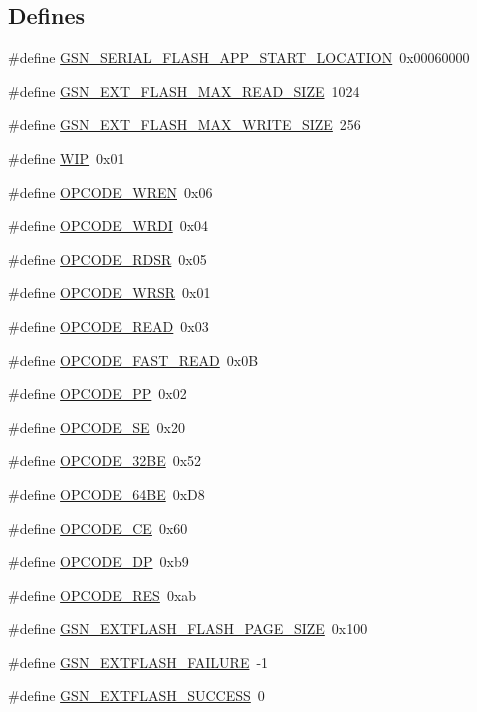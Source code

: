 \subsection*{Defines}
\begin{DoxyCompactItemize}
\item 
\#define \hyperlink{a00496_a2e9d396cf9751f126bb75703264ffe22}{GSN\_\-SERIAL\_\-FLASH\_\-APP\_\-START\_\-LOCATION}~0x00060000
\item 
\#define \hyperlink{a00496_a6fe277ae9982666f92a5ce2ee623228b}{GSN\_\-EXT\_\-FLASH\_\-MAX\_\-READ\_\-SIZE}~1024
\item 
\#define \hyperlink{a00496_a84d812f8d1343cffc3524235f29193ef}{GSN\_\-EXT\_\-FLASH\_\-MAX\_\-WRITE\_\-SIZE}~256
\item 
\#define \hyperlink{a00496_a6c36bc07fc8bb1cfddadb07cc7c11057}{WIP}~0x01
\item 
\#define \hyperlink{a00496_a2499a677769162b2db9424c0db4c4726}{OPCODE\_\-WREN}~0x06
\item 
\#define \hyperlink{a00496_a6ae63072814b0a02c13ae656414436dc}{OPCODE\_\-WRDI}~0x04
\item 
\#define \hyperlink{a00496_aa2e0d9ec33e0196631fd677bdf2c539e}{OPCODE\_\-RDSR}~0x05
\item 
\#define \hyperlink{a00496_ae79c88f89c9e30942e5aad16d6c68fec}{OPCODE\_\-WRSR}~0x01
\item 
\#define \hyperlink{a00496_a53a39a0edaa5fc54b0cf28e4965ada63}{OPCODE\_\-READ}~0x03
\item 
\#define \hyperlink{a00496_a190a2117b2ed1073af355e4d90d5ee23}{OPCODE\_\-FAST\_\-READ}~0x0B
\item 
\#define \hyperlink{a00496_a3e3acee61fdd12daea9633cbf82ddd86}{OPCODE\_\-PP}~0x02
\item 
\#define \hyperlink{a00496_aa22f3d73ba8ba4cea869c3526e2557ea}{OPCODE\_\-SE}~0x20
\item 
\#define \hyperlink{a00496_a5416ef17d7dca4bd942b39e05571cc0f}{OPCODE\_\-32BE}~0x52
\item 
\#define \hyperlink{a00496_a85cd9f0f5ccb723e21f141a5bc1052d0}{OPCODE\_\-64BE}~0xD8
\item 
\#define \hyperlink{a00496_a167172ea361250e989670f06208a3fb3}{OPCODE\_\-CE}~0x60
\item 
\#define \hyperlink{a00496_aa2192e62ba531b168de0f2ced5ca0b0c}{OPCODE\_\-DP}~0xb9
\item 
\#define \hyperlink{a00496_a1d08eaf1ec3802e1dabb1fc178c87335}{OPCODE\_\-RES}~0xab
\item 
\#define \hyperlink{a00496_a3cf8e44b3ab3cc715aa8675fe8376758}{GSN\_\-EXTFLASH\_\-FLASH\_\-PAGE\_\-SIZE}~0x100
\item 
\#define \hyperlink{a00496_ac08f086dea3e2c40d9f74cbbbd0e2a0c}{GSN\_\-EXTFLASH\_\-FAILURE}~-\/1
\item 
\#define \hyperlink{a00496_af30bc8c03f49335bd37cbea966f04ee1}{GSN\_\-EXTFLASH\_\-SUCCESS}~0
\end{DoxyCompactItemize}
